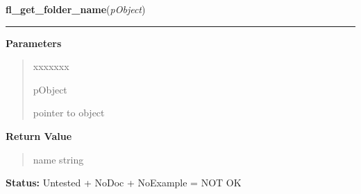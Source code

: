 \hspace{.8\funcindent}\begin{boxedminipage}{\funcwidth}

    \raggedright \textbf{fl\_get\_folder\_name}(\textit{pObject})

    \vspace{-1.5ex}

    \rule{\textwidth}{0.5\fboxrule}
\setlength{\parskip}{2ex}
\setlength{\parskip}{1ex}
      \textbf{Parameters}
      \vspace{-1ex}

      \begin{quote}
        \begin{Ventry}{xxxxxxx}

          \item[pObject]

          pointer to object

        \end{Ventry}

      \end{quote}

      \textbf{Return Value}
    \vspace{-1ex}

      \begin{quote}
      name string

      \end{quote}

\textbf{Status:} Untested + NoDoc + NoExample = NOT OK



    \end{boxedminipage}

    \label{xformslib:library:fl_get_tabfolder_numfolders}

    \vspace{0.5ex}

